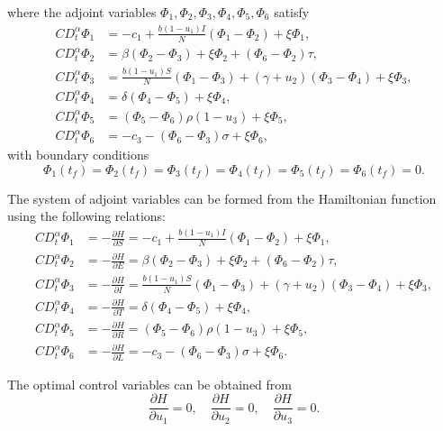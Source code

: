 \documentclass[10pt]{NSP1}
\begin{document}
	where the adjoint variables \(\Phi_1,\Phi_2,\Phi_3,\Phi_4,\Phi_5,\Phi_6\) satisfy
	\[
	\begin{aligned}
		CD_{t}^{\alpha}\Phi_1 &= -c_1 + \frac{b(1-u_1) I}{N}(\Phi_1-\Phi_2) + \xi\Phi_1,\\
		CD_{t}^{\alpha}\Phi_2 &= \beta(\Phi_2-\Phi_3) + \xi\Phi_2 + (\Phi_6-\Phi_2)\tau,\\
		CD_{t}^{\alpha}\Phi_3 &= \frac{b(1-u_1) S}{N}(\Phi_1-\Phi_3) + (\gamma+u_2)(\Phi_3-\Phi_4) + \xi\Phi_3,\\
		CD_{t}^{\alpha}\Phi_4 &= \delta(\Phi_4-\Phi_5) + \xi\Phi_4,\\
		CD_{t}^{\alpha}\Phi_5 &= (\Phi_5-\Phi_6)\rho(1-u_3) + \xi\Phi_5,\\
		CD_{t}^{\alpha}\Phi_6 &= -c_3 - (\Phi_6-\Phi_3)\sigma + \xi\Phi_6,
	\end{aligned} \tag{5.6}
	\]
	with boundary conditions
	\[
	\Phi_1(t_f)=\Phi_2(t_f)=\Phi_3(t_f)=\Phi_4(t_f)=\Phi_5(t_f)=\Phi_6(t_f)=0.
	\]
	
	\par\vspace{14.0pt}\vspace{14.0pt}
	
	The system of adjoint variables can be formed from the Hamiltonian function using the following relations:
	\[
	\begin{aligned}
		CD_{t}^{\alpha}\Phi_1 &= -\frac{\partial H}{\partial S} = -c_1 + \frac{b(1-u_1) I}{N}(\Phi_1-\Phi_2) + \xi\Phi_1,\\
		CD_{t}^{\alpha}\Phi_2 &= -\frac{\partial H}{\partial E} = \beta(\Phi_2-\Phi_3) + \xi\Phi_2 + (\Phi_6-\Phi_2)\tau,\\
		CD_{t}^{\alpha}\Phi_3 &= -\frac{\partial H}{\partial I} = \frac{b(1-u_1) S}{N}(\Phi_1-\Phi_3) + (\gamma+u_2)(\Phi_3-\Phi_4) + \xi\Phi_3,\\
		CD_{t}^{\alpha}\Phi_4 &= -\frac{\partial H}{\partial T} = \delta(\Phi_4-\Phi_5) + \xi\Phi_4,\\
		CD_{t}^{\alpha}\Phi_5 &= -\frac{\partial H}{\partial R} = (\Phi_5-\Phi_6)\rho(1-u_3) + \xi\Phi_5,\\
		CD_{t}^{\alpha}\Phi_6 &= -\frac{\partial H}{\partial L} = -c_3 - (\Phi_6-\Phi_3)\sigma + \xi\Phi_6.
	\end{aligned}
	\]
	
	The optimal control variables can be obtained from
	\[
	\frac{\partial H}{\partial u_1}=0,\quad \frac{\partial H}{\partial u_2}=0,\quad \frac{\partial H}{\partial u_3}=0.
	\]
	
\end{document}
